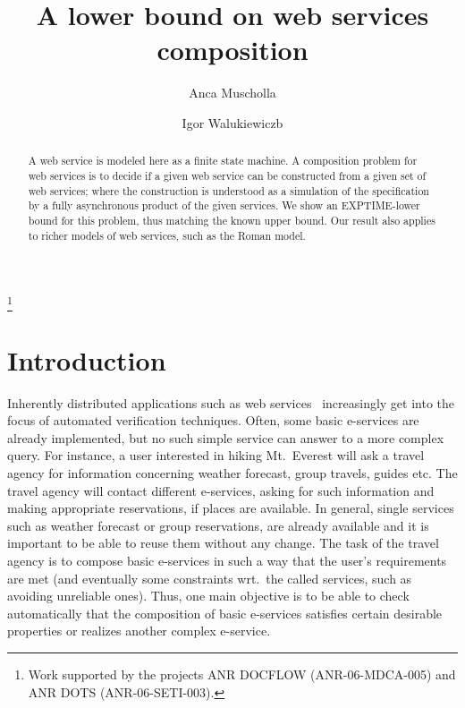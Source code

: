 \documentclass{LMCS}
\theoremstyle{plain}\newtheorem{remark}{Remark}
\theoremstyle{plain}\newtheorem{lemma}[thm]{Lemma}
\begin{document}
\title{A lower bound on web services composition}
\author[A.~Muscholl]{Anca Muscholl\rsuper a}
\address{{\lsuper a}LaBRI, Universit{\'e} Bordeaux\\
351, Cours de la Lib\'eration\\
F-33 405, Talence cedex, France}

\author[I.~Walukiewicz]{Igor Walukiewicz\rsuper b}
\address{{\lsuper b}CNRS LaBRI, 351, Cours de la Lib\'eration,
F-33 405, Talence cedex, France}

\thanks{{}Work supported by the projects
    ANR DOCFLOW (ANR-06-MDCA-005) and ANR DOTS (ANR-06-SETI-003).}






\begin{abstract}
 	

A web service is modeled here as a finite state machine.  A composition
problem for web services is to decide if a given web service can be
constructed from a given set of web services; where the construction
is understood as a simulation of the specification by a fully asynchronous 
product of the given services. We show an EXPTIME-lower bound for this problem, 
thus matching the known upper bound.  Our result
also applies to richer models of web services, such as the Roman 
model.

\end{abstract}

\maketitle

\section{Introduction}

Inherently distributed applications such as web services~\cite{ACKM04}
increasingly get into the focus of automated verification
techniques. Often, some basic e-services are already implemented, but
no such simple service can answer to a more complex query. For
instance, a user interested in hiking Mt.~Everest will ask a travel
agency for information concerning weather forecast, group travels,
guides etc. The travel agency will contact different e-services,
asking for such information and making appropriate reservations, if
places are available. In general, single services such as weather
forecast or group reservations, are already available and it is
important to be able to reuse them without any change. The task of the
travel agency is to compose basic e-services in such a way that the
user's requirements are met (and eventually some constraints wrt.~the
called services, such as avoiding unreliable ones). Thus, one main
objective is to be able to check automatically that the composition of
basic e-services satisfies certain desirable properties or realizes
another complex e-service.
\end{document}
